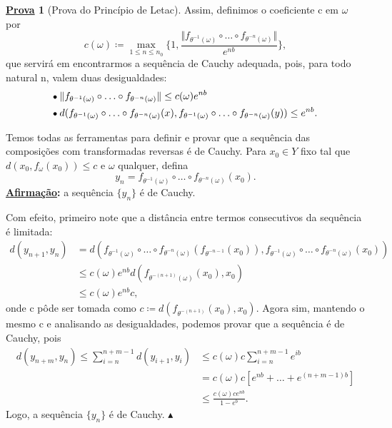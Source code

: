\documentclass[12pt, a4paper]{article}
\theoremstyle{definition}
\newtheorem*{proof*}{\underline{Prova}}
\begin{document}
\begin{proof*} [Prova do Princípio de Letac]
	Assim, definimos o coeficiente c em \(\omega \) por
	\[
		c(\omega ) \coloneqq \max\limits_{1\leq n\leq n_{0}} \biggl\{1, \frac{\Vert f_{\theta^{-1}(\omega )} \circ \dotsc \circ f_{\theta^{-n}(\omega )} \Vert}{e^{nb}}\biggr\},
	\]
	que servirá em encontrarmos a sequência de Cauchy adequada, pois, para todo natural n, valem duas desigualdades:
	\begin{align*}
		 & \tikz[baseline=-0.5ex]\draw[black, fill=black, radius=1.5pt](0, 0)circle; \;\Vert f_{\theta^{-1}(\omega )} \circ \dotsc \circ f_{\theta^{-n}(\omega )}\Vert \leq c(\omega )e^{nb}                                                             \\
		 & \tikz[baseline=-0.5ex]\draw[black, fill=black, radius=1.5pt](0, 0)circle; \; d(f_{\theta^{-1}(\omega )} \circ \dotsc \circ f_{\theta^{-n}(\omega )}(x), f_{\theta^{-1}(\omega )} \circ \dotsc \circ f_{\theta^{-n}(\omega )}(y)) \leq e^{nb}.
	\end{align*}

	Temos todas as ferramentas para definir e provar que a sequência das composições com transformadas reversas é de Cauchy. Para \(x_{0}\in Y\) fixo tal que\linebreak{} \(d(x_{0}, f_{\omega}(x_{0}))\leq c\) e \(\omega \) qualquer, defina
	\[
		y_{n}=f_{\theta^{-1}(\omega )}\circ \dotsc \circ f_{\theta^{-n}(\omega )}(x_{0}).
	\]
	\textbf{\underline{Afirmação}:} a sequência \(\{y_{n}\}\) é de Cauchy.

	Com efeito, primeiro note que a distância entre termos consecutivos da sequência é limitada:
	\begin{align*}
		d(y_{n+1}, y_{n}) & = d(f_{\theta^{-1}(\omega )} \circ \dotsc \circ f_{\theta^{-n}(\omega )}(f_{\theta^{-n-1}}(x_{0})), f_{\theta^{-1}(\omega )} \circ \dotsc \circ f_{\theta^{-n}(\omega )}(x_{0})) \\
		                  & \leq c(\omega )e^{nb}d(f_{\theta^{-(n+1)}(\omega )}(x_{0}), x_{0})                                                                                                               \\
		                  & \leq c(\omega )e^{nb}c,
	\end{align*}
	onde c pôde ser tomada como \(c\coloneqq d(f_{\theta^{-(n+1)}}(x_{0}), x_{0})\).
	Agora sim, mantendo o mesmo c e analisando as desigualdades, podemos provar que a sequência é de Cauchy, pois
	\begin{align*}
		d(y_{n+m}, y_{n}) \leq \sum\limits_{i=n}^{n+m-1}d(y_{i+1}, y_{i}) & \leq c(\omega )c \sum\limits_{i=n}^{n+m-1}e^{ib} \\
		                                                                  & =c(\omega )c[e^{nb}+\dotsc +e^{(n+m-1)b}]        \\
		                                                                  & \leq \frac{c(\omega )ce^{nb}}{1-e^{b}}.
	\end{align*}
	Logo, a sequência \(\{y_{n}\}\) é de Cauchy. \(\blacktriangle\)


\end{proof*}
\end{document}
